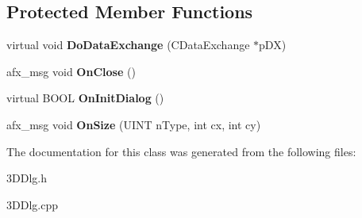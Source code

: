 \subsection*{Protected Member Functions}
\begin{DoxyCompactItemize}
\item 
\hypertarget{class_c3_d_dlg_a947312a30fc32a2cf716bc505b0d5c0e}{virtual void {\bfseries Do\-Data\-Exchange} (C\-Data\-Exchange $\ast$p\-D\-X)}\label{class_c3_d_dlg_a947312a30fc32a2cf716bc505b0d5c0e}

\item 
\hypertarget{class_c3_d_dlg_a507aed6c862eca418275e7946d435d93}{afx\-\_\-msg void {\bfseries On\-Close} ()}\label{class_c3_d_dlg_a507aed6c862eca418275e7946d435d93}

\item 
\hypertarget{class_c3_d_dlg_ac1f6731c0d58808608b91abc56ed56d3}{virtual B\-O\-O\-L {\bfseries On\-Init\-Dialog} ()}\label{class_c3_d_dlg_ac1f6731c0d58808608b91abc56ed56d3}

\item 
\hypertarget{class_c3_d_dlg_a79d1f5a3d7395f2d6d166c8e56215073}{afx\-\_\-msg void {\bfseries On\-Size} (U\-I\-N\-T n\-Type, int cx, int cy)}\label{class_c3_d_dlg_a79d1f5a3d7395f2d6d166c8e56215073}

\end{DoxyCompactItemize}


The documentation for this class was generated from the following files\-:\begin{DoxyCompactItemize}
\item 
3\-D\-Dlg.\-h\item 
3\-D\-Dlg.\-cpp\end{DoxyCompactItemize}
